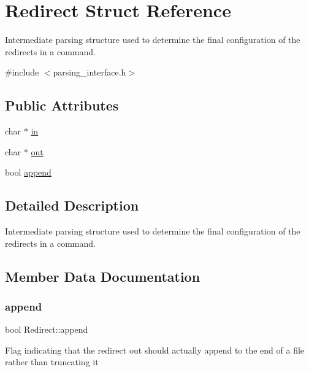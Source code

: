 \hypertarget{structRedirect}{}\section{Redirect Struct Reference}
\label{structRedirect}


Intermediate parsing structure used to determine the final configuration of the redirects in a command.  




{\ttfamily \#include $<$parsing\+\_\+interface.\+h$>$}

\subsection*{Public Attributes}
\begin{DoxyCompactItemize}
\item 
char $\ast$ \hyperlink{structRedirect_ab0e76f7e58a26d52216c8c4bfc9c2e83}{in}
\item 
char $\ast$ \hyperlink{structRedirect_a9d5efc0a96275e13eba0e71450771952}{out}
\item 
bool \hyperlink{structRedirect_aea1d3bd9c3b6e1dbf1661b616df9818e}{append}
\end{DoxyCompactItemize}


\subsection{Detailed Description}
Intermediate parsing structure used to determine the final configuration of the redirects in a command. 

\subsection{Member Data Documentation}
\mbox{\label{structRedirect_aea1d3bd9c3b6e1dbf1661b616df9818e}} 
\subsubsection{\texorpdfstring{append}{append}}
{\footnotesize\ttfamily bool Redirect\+::append}

Flag indicating that the redirect out should actually append to the end of a file rather than truncating it \mbox{\label{structRedirect_ab0e76f7e58a26d52216c8c4bfc9c2e83}} 

